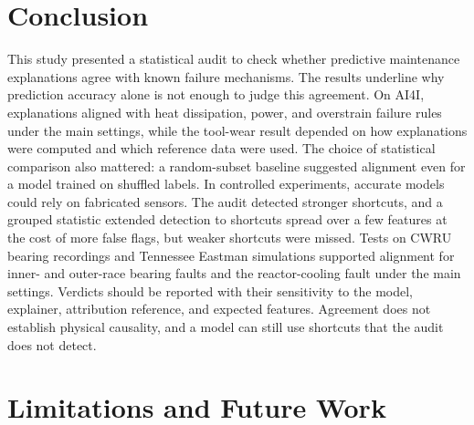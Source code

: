 \documentclass[conference]{IEEEtran}
\begin{document}



\section{Conclusion}
\label{sec:conclusion}

This study presented a statistical audit to check whether predictive maintenance explanations agree with known failure mechanisms. The results underline why prediction accuracy alone is not enough to judge this agreement. On AI4I, explanations aligned with heat dissipation, power, and overstrain failure rules under the main settings, while the tool-wear result depended on how explanations were computed and which reference data were used. The choice of statistical comparison also mattered: a random-subset baseline suggested alignment even for a model trained on shuffled labels. In controlled experiments, accurate models could rely on fabricated sensors. The audit detected stronger shortcuts, and a grouped statistic extended detection to shortcuts spread over a few features at the cost of more false flags, but weaker shortcuts were missed. Tests on CWRU bearing recordings and Tennessee Eastman simulations supported alignment for inner- and outer-race bearing faults and the reactor-cooling fault under the main settings. Verdicts should be reported with their sensitivity to the model, explainer, attribution reference, and expected features. Agreement does not establish physical causality, and a model can still use shortcuts that the audit does not detect.

\section{Limitations and Future Work}
\label{sec:limits_future}
\end{document}

